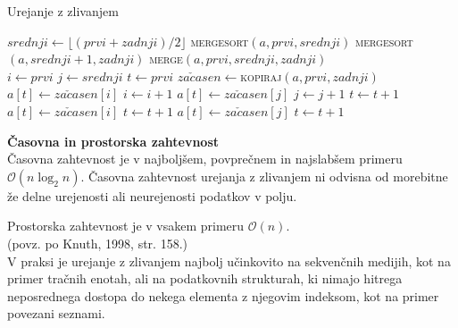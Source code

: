 \documentclass[a4paper,oneside,12pt]{article}
\newcommand{\subsubsubsection}[1]{\vspace*{1ex}\textbf{#1}\\}
\begin{document}
\begin{algorithm}[h!t!]
  \caption{Urejanje z zlivanjem}\label{algo:mergesort}
  \begin{algorithmic}[1]
         \Return \EndIf
        \State $srednji \gets \lfloor(prvi + zadnji) / 2\rfloor$
        \State \textsc{mergesort}$(a, prvi, srednji)$
        \State \textsc{mergesort}$(a, srednji + 1, zadnji)$
        \State \textsc{merge}$(a, prvi, srednji, zadnji)$
    \EndFunction
    \\
        \State $i \gets prvi$
        \State $j \gets srednji$
        \State $t \gets prvi$
        \State $za\check{c}asen \gets$\textsc{kopiraj}$(a, prvi, zadnji)$ 
                \State $a[t] \gets za\check{c}asen[i]$
                \State $i \gets i + 1$
            \Else
                \State $a[t] \gets za\check{c}asen[j]$
                \State $j \gets j + 1$
            \EndIf
            \State $t \gets t + 1$
        \EndWhile
            \State $a[t] \gets za\check{c}asen[i]$
            \State $t \gets t + 1$
        \EndWhile
            \State $a[t] \gets za\check{c}asen[j]$
            \State $t \gets t + 1$
        \EndWhile
    \EndFunction
  \end{algorithmic}
\end{algorithm}

\subsubsubsection{Časovna in prostorska zahtevnost} \nopagebreak
Časovna zahtevnost je v najboljšem, povprečnem in najslabšem primeru 
$\mathcal{O}(n\log_2 n)$. Časovna zahtevnost urejanja z zlivanjem ni odvisna od
morebitne že delne urejenosti ali neurejenosti podatkov v polju. 

Prostorska zahtevnost je v vsakem primeru $\mathcal{O}(n)$.\\ %
(povz. po Knuth, 1998, str. 158.) \\

V praksi je urejanje z zlivanjem najbolj učinkovito na
sekvenčnih medijih, kot na primer tračnih enotah, ali na podatkovnih strukturah, ki nimajo hitrega
neposrednega dostopa do nekega elementa z njegovim indeksom, kot na primer povezani seznami.
\end{document}
